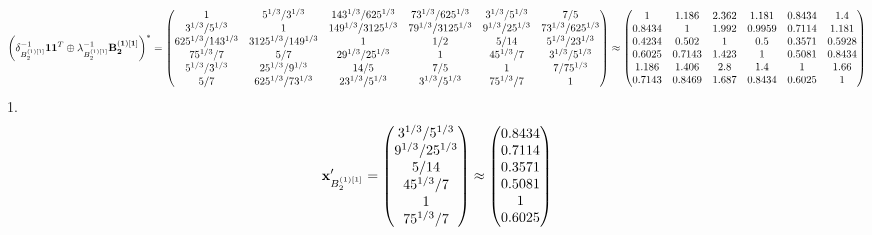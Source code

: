 \documentclass[10pt,a4paper]{article}
\begin{document}
	\[
		\left(\delta_{B_2^{(1)[1]}}^{-1}\bold{11}^T \oplus \lambda_{B_2^{(1)[1]}}^{-1}\bold{B_2^{(1)[1]}}\right)^* = 
		\begin{pmatrix}
			{1}{} & {{5^ {1 / 3}}} / {{3^ {1 / 3}}} & {{14}{3^ {1 / 3}}} / {{625^ {1 / 3}}} & {{7}{3^ {1 / 3}}} / {{625^ {1 / 3}}} & {{3^ {1 / 3}}} / {{5^ {1 / 3}}} & {{7}} / {{5}} \\
			{{3^ {1 / 3}}} / {{5^ {1 / 3}}} & {1}{} & {{14}{9^ {1 / 3}}} / {{3125^ {1 / 3}}} & {{7}{9^ {1 / 3}}} / {{3125^ {1 / 3}}} & {{9^ {1 / 3}}} / {{25^ {1 / 3}}} & {{7}{3^ {1 / 3}}} / {{625^ {1 / 3}}} \\
			{{625^ {1 / 3}}} / {{14}{3^ {1 / 3}}} & {{3125^ {1 / 3}}} / {{14}{9^ {1 / 3}}} & {1}{} & {1} / {{2}} & {{5}} / {{14}} & {{5^ {1 / 3}}} / {{2}{3^ {1 / 3}}} \\
			{{75^ {1 / 3}}} / {{7}} & {{5}} / {{7}} & {{2}{9^ {1 / 3}}} / {{25^ {1 / 3}}} & {1}{} & {{45^ {1 / 3}}} / {{7}} & {{3^ {1 / 3}}} / {{5^ {1 / 3}}} \\
			{{5^ {1 / 3}}} / {{3^ {1 / 3}}} & {{25^ {1 / 3}}} / {{9^ {1 / 3}}} & {{14}} / {{5}} & {{7}} / {{5}} & {1}{} & {{7}} / {{75^ {1 / 3}}} \\
			{{5}} / {{7}} & {{625^ {1 / 3}}} / {{7}{3^ {1 / 3}}} & {{2}{3^ {1 / 3}}} / {{5^ {1 / 3}}} & {{3^ {1 / 3}}} / {{5^ {1 / 3}}} & {{75^ {1 / 3}}} / {{7}} & {1}{} \\
		\end{pmatrix}
		\approx
		\begin{pmatrix}
			1        & 1.186    & 2.362    & 1.181    & 0.8434   & 1.4      \\
			0.8434   & 1        & 1.992    & 0.9959   & 0.7114   & 1.181    \\
			0.4234   & 0.502    & 1        & 0.5      & 0.3571   & 0.5928   \\
			0.6025   & 0.7143   & 1.423    & 1        & 0.5081   & 0.8434   \\
			1.186    & 1.406    & 2.8      & 1.4      & 1        & 1.66     \\
			0.7143   & 0.8469   & 1.687    & 0.8434   & 0.6025   & 1        \\
		\end{pmatrix}
	\]
	1.
	\[
		\bold{x}'_{B_2^{(1)[1]}} = 
		\begin{pmatrix}
			{{3^ {1 / 3}}} / {{5^ {1 / 3}}} \\
			{{9^ {1 / 3}}} / {{25^ {1 / 3}}} \\
			{{5}} / {{14}} \\
			{{45^ {1 / 3}}} / {{7}} \\
			{1}{} \\
			{{75^ {1 / 3}}} / {{7}} \\
		\end{pmatrix}
		\approx
		\begin{pmatrix}
			0.8434   \\
			0.7114   \\
			0.3571   \\
			0.5081   \\
			1        \\
			0.6025   \\
		\end{pmatrix}
	\]
\end{document}
